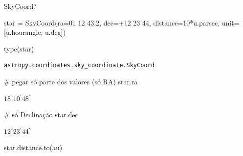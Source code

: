 \documentclass[
  letterpaper,
  DIV=11,
  numbers=noendperiod]{scrreprt}
\newenvironment{Shaded}{\begin{snugshade}}{\end{snugshade}}
\newcommand{\BuiltInTok}[1]{\textcolor[rgb]{0.00,0.23,0.31}{#1}}
\newcommand{\CommentTok}[1]{\textcolor[rgb]{0.37,0.37,0.37}{#1}}
\newcommand{\DecValTok}[1]{\textcolor[rgb]{0.68,0.00,0.00}{#1}}
\newcommand{\NormalTok}[1]{\textcolor[rgb]{0.00,0.23,0.31}{#1}}
\newcommand{\OperatorTok}[1]{\textcolor[rgb]{0.37,0.37,0.37}{#1}}
\newcommand{\StringTok}[1]{\textcolor[rgb]{0.13,0.47,0.30}{#1}}
\begin{document}
\begin{Shaded}
\begin{Highlighting}[]
\NormalTok{SkyCoord?}
\end{Highlighting}
\end{Shaded}

\begin{Shaded}
\begin{Highlighting}[]
\NormalTok{star }\OperatorTok{=}\NormalTok{ SkyCoord(ra}\OperatorTok{=}\StringTok{\textquotesingle{}01 12 43.2\textquotesingle{}}\NormalTok{, }
\NormalTok{                dec}\OperatorTok{=}\StringTok{\textquotesingle{}+12 23 44\textquotesingle{}}\NormalTok{, }
\NormalTok{                distance}\OperatorTok{=}\DecValTok{10}\OperatorTok{*}\NormalTok{u.parsec, }
\NormalTok{                unit}\OperatorTok{=}\NormalTok{[u.hourangle, u.deg])}
\end{Highlighting}
\end{Shaded}

\begin{Shaded}
\begin{Highlighting}[]
\BuiltInTok{type}\NormalTok{(star)}
\end{Highlighting}
\end{Shaded}

\begin{verbatim}
astropy.coordinates.sky_coordinate.SkyCoord
\end{verbatim}

\begin{Shaded}
\begin{Highlighting}[]
\CommentTok{\# pegar só parte dos valores (só RA)}
\NormalTok{star.ra}
\end{Highlighting}
\end{Shaded}

$18^\circ10{}^\prime48{}^{\prime\prime}$

\begin{Shaded}
\begin{Highlighting}[]
\CommentTok{\# só Declinação}
\NormalTok{star.dec}
\end{Highlighting}
\end{Shaded}

$12^\circ23{}^\prime44{}^{\prime\prime}$

\begin{Shaded}
\begin{Highlighting}[]
\NormalTok{star.distance.to(}\StringTok{\textquotesingle{}au\textquotesingle{}}\NormalTok{)}
\end{Highlighting}
\end{Shaded}
\end{document}
